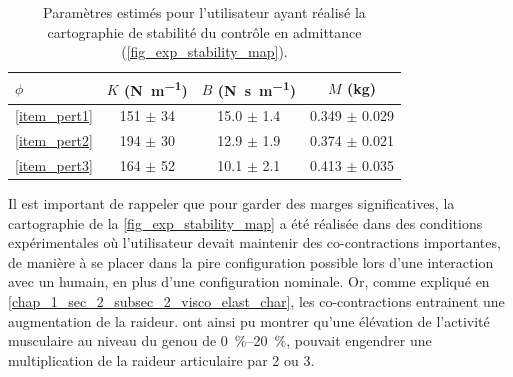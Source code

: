 \begin{table}
	\centering
	\begin{tabular}{ l | c | c | c }
		$\phi$ & $K$ (\si{\newton\per\meter}) & $B$ (\si{\newton\second\per\meter}) & $M$ (\si{\kilogram})\\\hline%
		\cref{item_pert1} & 151 $\pm$ 34 & 15.0 $\pm$ 1.4 & 0.349 $\pm$ 0.029\\%
		\cref{item_pert2} & 194 $\pm$ 30 & 12.9 $\pm$ 1.9 & 0.374 $\pm$ 0.021\\%
		\cref{item_pert3} & 164 $\pm$ 52 & 10.1 $\pm$ 2.1 & 0.413 $\pm$ 0.035\\%
	\end{tabular}
	\caption[Paramètres estimés pour l'utilisateur ayant réalisé la cartographie de stabilité du contrôle en admittance]{Paramètres estimés pour l'utilisateur ayant réalisé la cartographie de stabilité du contrôle en admittance (\cref{fig_exp_stability_map}).}
	\label{tab_impedance_param_user_000}
\end{table}

Il est important de rappeler que pour garder des marges significatives, la cartographie de la \cref{fig_exp_stability_map} a été réalisée dans des conditions expérimentales où l'utilisateur devait maintenir des co-contractions importantes, de manière à se placer dans la pire configuration possible lors d'une interaction avec un humain, en plus d'une configuration nominale. Or, comme expliqué en \cref{chap_1_sec_2_subsec_2_visco_elast_char}, les co-contractions entrainent une augmentation de la raideur. \textcite{shabani_simulating_2018} ont ainsi pu montrer qu'une élévation de l'activité musculaire au niveau du genou de \SIrange{0}{20}{\percent}, pouvait engendrer une multiplication de la raideur articulaire par 2 ou 3.


